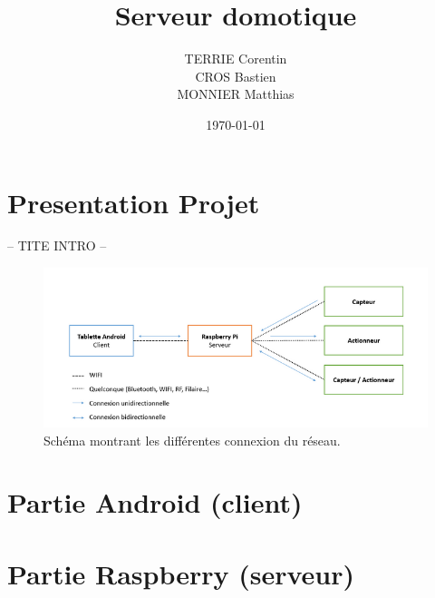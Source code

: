 \documentclass[a4paper,10pt]{article}
\title{Serveur domotique}
\author{TERRIE Corentin \\ CROS Bastien \\ MONNIER Matthias}
\date{\today}
\begin{document}

\tableofcontents
\clearpage


\section{Presentation Projet}

-- TITE INTRO --
\begin{figure}[H]
\centering\includegraphics[scale=0.7]{images/Shema_projet.png}
\caption{Schéma montrant les différentes connexion du réseau.}
\end{figure}


\section{Partie Android (client)}




\section{Partie Raspberry (serveur)}
\end{document}
